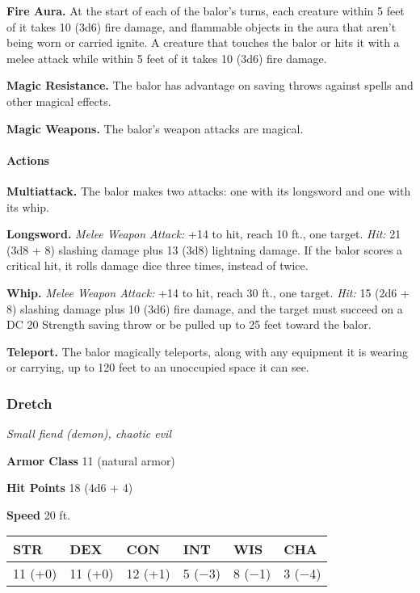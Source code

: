 \documentclass[
]{article}
\begin{document}
\textbf{Fire Aura.} At the start of each of the balor's turns, each
creature within 5 feet of it takes 10 (3d6) fire damage, and flammable
objects in the aura that aren't being worn or carried ignite. A creature
that touches the balor or hits it with a melee attack while within 5
feet of it takes 10 (3d6) fire damage.

\textbf{Magic Resistance.} The balor has advantage on saving throws
against spells and other magical effects.

\textbf{Magic Weapons.} The balor's weapon attacks are magical.

\hypertarget{actions-1}{%
\paragraph{Actions}\label{actions-1}}

\textbf{Multiattack.} The balor makes two attacks: one with its
longsword and one with its whip.

\textbf{Longsword.} \emph{Melee Weapon Attack:} +14 to hit, reach 10
ft., one target. \emph{Hit:} 21 (3d8 + 8) slashing damage plus 13 (3d8)
lightning damage. If the balor scores a critical hit, it rolls damage
dice three times, instead of twice.

\textbf{Whip.} \emph{Melee Weapon Attack:} +14 to hit, reach 30 ft., one
target. \emph{Hit:} 15 (2d6 + 8) slashing damage plus 10 (3d6) fire
damage, and the target must succeed on a DC 20 Strength saving throw or
be pulled up to 25 feet toward the balor.

\textbf{Teleport.} The balor magically teleports, along with any
equipment it is wearing or carrying, up to 120 feet to an unoccupied
space it can see.

\hypertarget{dretch}{%
\subsubsection{Dretch}\label{dretch}}

\emph{Small fiend (demon), chaotic evil}

\textbf{Armor Class} 11 (natural armor)

\textbf{Hit Points} 18 (4d6 + 4)

\textbf{Speed} 20 ft.

\begin{longtable}[]{@{}llllll@{}}
\toprule
STR & DEX & CON & INT & WIS & CHA\tabularnewline
\midrule
\endhead
11 (+0) & 11 (+0) & 12 (+1) & 5 (−3) & 8 (−1) & 3 (−4)\tabularnewline
\bottomrule
\end{longtable}
\end{document}
